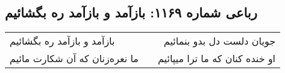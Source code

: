 \begin{center}
\section*{رباعی شماره ۱۱۶۹: بازآمد و بازآمد ره بگشائیم}
\label{sec:1169}
\begin{longtable}{l p{0.5cm} r}
بازآمد و بازآمد ره بگشائیم
&&
جویان دلست دل بدو بنمائیم
\\
ما نعره‌زنان که آن شکارت مائیم
&&
او خنده کنان که ما ترا میپائیم
\\
\end{longtable}
\end{center}
